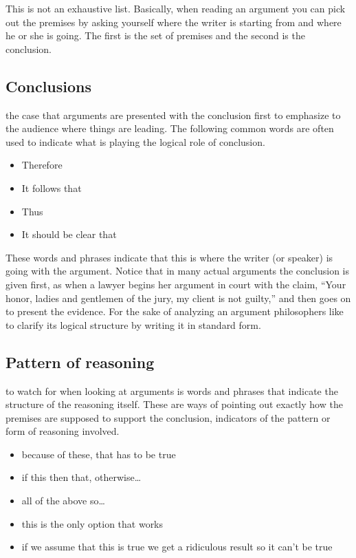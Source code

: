 \documentclass[justified]{tufte-book}
\providecommand{\tightlist}{%
  \setlength{\itemsep}{0pt}\setlength{\parskip}{0pt}}
\begin{document}
This is not an exhaustive list. Basically, when reading an argument you can pick out the premises by asking yourself where the writer is starting from and where he or she is going. The first is the set of premises and the second is the conclusion.

\hypertarget{conclusions}{%
\subsection*{Conclusions}\label{conclusions}}

 the case that arguments are presented with the conclusion first to emphasize to the audience where things are leading. The following common words are often used to indicate what is playing the logical role of conclusion.

\begin{itemize}
\tightlist
\item
  Therefore
\item
  It follows that
\item
  Thus
\item
  It should be clear that
\end{itemize}

These words and phrases indicate that this is where the writer (or speaker) is going with the argument. Notice that in many actual arguments the conclusion is given first, as when a lawyer begins her argument in court with the claim, ``Your honor, ladies and gentlemen of the jury, my client is not guilty,'' and then goes on to present the evidence. For the sake of analyzing an argument philosophers like to clarify its logical structure by writing it in standard form.

\hypertarget{pattern-of-reasoning}{%
\subsection*{Pattern of reasoning}\label{pattern-of-reasoning}}

 to watch for when looking at arguments is words and phrases that indicate the structure of the reasoning itself. These are ways of pointing out exactly how the premises are supposed to support the conclusion, indicators of the pattern or form of reasoning involved.

\begin{itemize}
\tightlist
\item
  because of these, that has to be true
\item
  if this then that, otherwise\ldots{}
\item
  all of the above so\ldots{}
\item
  this is the only option that works
\item
  if we assume that this is true we get a ridiculous result so it can't be true
\end{itemize}
\end{document}
